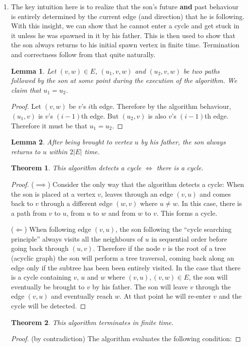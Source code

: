 \documentclass{article}
\newtheorem{theorem}{Theorem}
\newtheorem{lemma}{Lemma}
\begin{document}
\begin{enumerate}
\newpage
\item The key intuition here is to realize that the son's future \textbf{and} past behaviour is entirely determined by the current edge (and direction) that he is following. With this insight, we can show that he cannot enter a cycle and get stuck in it unless he was spawned in it by his father. This is then used to show that the son always returns to his initial spawn vertex in finite time. Termination and correctness follow from that quite naturally.

\begin{lemma}\label{lemma_deter}
Let $(v,w)\in E$, $(u_1,v,w)$ and $(u_2,v,w)$ be two paths followed by the son at some point during the execution of the algorithm. We claim that $u_1=u_2$.
\end{lemma}
\begin{proof}
Let $(v,w)$ be $v$'s $i$th edge. Therefore by the algorithm behaviour, $(u_1,v)$ is $v$'s $(i-1)$th edge. But $(u_2,v)$ is also $v$'s $(i-1)$th edge. Therefore it must be that $u_1=u_2$.
\end{proof}

\begin{lemma}After being brought to vertex $u$ by his father, the son always returns to $u$ within $2|E|$ time.
\end{lemma}

\begin{theorem}This algorithm detects a cycle $\iff$ there is a cycle.\end{theorem}
\begin{proof}
($\implies$) Consider the only way that the algorithm detects a cycle: When the son is placed at a vertex $v$, leaves through an edge $(v,u)$ and comes back to $v$ through a different edge $(w,v)$ where $u\not=w$. In this case, there is a path from $v$ to $u$, from $u$ to $w$ and from $w$ to $v$. This forms a cycle.

($\Longleftarrow$) When following edge $(v,u)$, the son following the ``cycle searching principle'' always visits all the neighbours of $u$ in sequential order before going back through $(u,v)$. Therefore if the node $v$ is the root of a tree (acyclic graph) the son will perform a tree traversal, coming back along an edge only if the subtree has been been entirely visited. In the case that there is a cycle containing $v$, $u$ and $w$ where $(v,u),(v,w)\in E$, the son will eventually be brought to $v$ by his father. The son will leave $v$ through the edge $(v,u)$ and eventually reach $w$. At that point he will re-enter $v$ and the cycle will be detected.
\end{proof}
\begin{theorem}This algorithm terminates in finite time.\end{theorem}
\begin{proof} (by contradiction) The algorithm evaluates the following condition:


\end{proof}
\end{enumerate}
\end{document}
